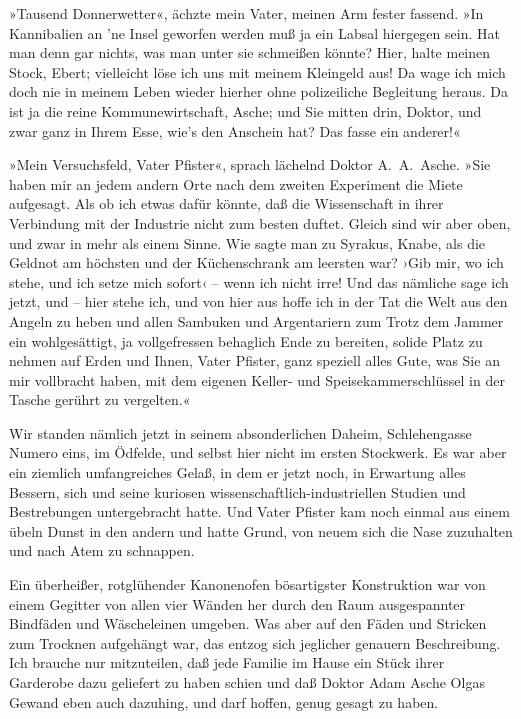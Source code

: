 »Tausend Donnerwetter«, ächzte mein Vater, meinen Arm fester
fassend. »In Kannibalien an 'ne Insel geworfen werden muß ja ein
Labsal hiergegen sein. Hat man denn gar nichts, was man unter sie
schmeißen könnte? Hier, halte meinen Stock, Ebert; vielleicht löse
ich uns mit meinem Kleingeld aus! Da wage ich mich doch nie in
meinem Leben wieder hierher ohne polizeiliche Begleitung heraus. Da
ist ja die reine Kommunewirtschaft, Asche; und Sie mitten drin,
Doktor, und zwar ganz in Ihrem Esse, wie's den Anschein hat? Das
fasse ein anderer!«

»Mein Versuchsfeld, Vater Pfister«, sprach lächelnd Doktor
A.~A.~Asche. »Sie haben mir an jedem andern Orte nach dem zweiten
Experiment die Miete aufgesagt. Als ob ich etwas dafür könnte, daß
die Wissenschaft in ihrer Verbindung mit der Industrie nicht zum
besten duftet. Gleich sind wir aber oben, und zwar in mehr als
einem Sinne. Wie sagte man zu Syrakus, Knabe, als die Geldnot am
höchsten und der Küchenschrank am leersten war? ›Gib mir, wo ich
stehe, und ich setze mich sofort‹ – wenn ich nicht irre! Und das
nämliche sage ich jetzt, und – hier stehe ich, und von hier aus
hoffe ich in der Tat die Welt aus den Angeln zu heben und allen
Sambuken und Argentariern zum Trotz dem Jammer ein wohlgesättigt,
ja vollgefressen behaglich Ende zu bereiten, solide Platz zu nehmen
auf Erden und Ihnen, Vater Pfister, ganz speziell alles Gute, was
Sie an mir vollbracht haben, mit dem eigenen Keller- und
Speisekammerschlüssel in der Tasche gerührt zu vergelten.«

Wir standen nämlich jetzt in seinem absonderlichen Daheim,
Schlehengasse Numero eins, im Ödfelde, und selbst hier nicht im
ersten Stockwerk. Es war aber ein ziemlich umfangreiches Gelaß, in
dem er jetzt noch, in Erwartung alles Bessern, sich und seine
kuriosen wissenschaftlich-industriellen Studien und Bestrebungen
untergebracht hatte. Und Vater Pfister kam noch einmal aus einem
übeln Dunst in den andern und hatte Grund, von neuem sich die Nase
zuzuhalten und nach Atem zu schnappen.

Ein überheißer, rotglühender Kanonenofen bösartigster Konstruktion
war von einem Gegitter von allen vier Wänden her durch den Raum
ausgespannter Bindfäden und Wäscheleinen umgeben. Was aber auf den
Fäden und Stricken zum Trocknen aufgehängt war, das entzog sich
jeglicher genauern Beschreibung. Ich brauche nur mitzuteilen, daß
jede Familie im Hause ein Stück ihrer Garderobe dazu geliefert zu
haben schien und daß Doktor Adam Asche Olgas Gewand eben auch
dazuhing, und darf hoffen, genug gesagt zu haben.

